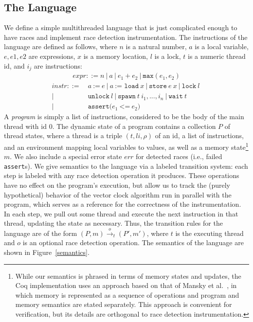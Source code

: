 \documentclass[preprint, 10pt]{sigplanconf}
\newcommand{\assign}[2]{#1\ \texttt{:=}\ #2}
\newcommand{\load}[2]{#1\ \texttt{:= load}\ #2}
\newcommand{\store}[2]{\texttt{store}\ #2\ #1}
\newcommand{\lock}[1]{\texttt{lock}\ #1}
\newcommand{\unlock}[1]{\texttt{unlock}\ #1}
\newcommand{\spawn}[2]{\texttt{spawn}\ #1\ #2}
\newcommand{\wait}[1]{\texttt{wait}\ #1}
\newcommand{\assert}[2]{\texttt{assert(}#1\ \texttt{<=}\ #2\texttt{)}}
\newcommand{\cfg}[2]{\ensuremath{(#1, #2)}}
\newcommand{\anarrow}[2]{\ensuremath{\xrightarrow{#2}_{#1}}}
\newcommand{\exec}[5]{\ensuremath{\cfg{#1}{#2} \anarrow{#3}{#4} #5}}
\begin{document}
\subsection{The Language}
We define a simple multithreaded language that is just complicated enough to have races and implement race detection instrumentation. The instructions of the language are defined as follows, where $n$ is a natural number, $a$ is a local variable, $e, e1, e2$ are expressions, $x$ is a memory location, $l$ is a lock, $t$ is a numeric thread id, and $i_j$ are instructions:
\begin{align*}\mathit{expr} ::= n~|~a~|~e_1 + e_2~|~\mathtt{max}(e_1, e_2)\end{align*}
\begin{align*}\mathit{instr} ::=\ &\assign{a}{e}~|~\load{a}{x}~|~\store{x}{e}~|~\lock{l}~\\|~&\unlock{l}~|~\spawn{t}{i_1, ..., i_n}~|~\wait{t}~\\|~&\assert{e_1}{e_2}\end{align*}
A \emph{program} is simply a list of instructions, considered to be the body of the main thread with id $0$. The dynamic state of a program contains a collection $P$ of thread states, where a thread is a triple $(t, \mathit{li}, \rho)$ of an id, a list of instructions, and an environment mapping local variables to values, as well as a memory state\footnote{While our semantics is phrased in terms of memory states and updates, the Coq implementation uses an approach based on that of Mansky et al.~\cite{memspec}, in which memory is represented as a sequence of operations and program and memory semantics are stated separately. This approach is convenient for verification, but its details are orthogonal to race detection instrumentation.} $m$. We also include a special error state $\mathit{err}$ for detected races (i.e., failed \texttt{assert}s). We give semantics to the language via a labeled transition system: each step is labeled with any race detection operation it produces. These operations have no effect on the program's execution, but allow us to track the (purely hypothetical) behavior of the vector clock algorithm run in parallel with the program, which serves as a reference for the correctness of the instrumentation. In each step, we pull out some thread and execute the next instruction in that thread, updating the state as necessary. Thus, the transition rules for the language are of the form \exec{P}{m}{t}{o}{(P', m')}, where $t$ is the executing thread and $o$ is an optional race detection operation. The semantics of the language are shown in Figure~\ref{semantics}.
\end{document}
